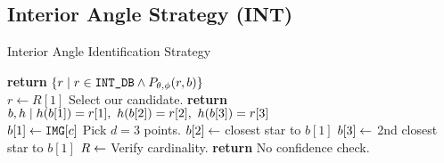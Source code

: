 \subsection{Interior Angle Strategy (INT)}\label{subsec:interiorAngleMethod}
\begin{algorithm}
    \caption{Interior Angle Identification Strategy} \label{algorithm:interiorAngleIdentification}
    \begin{algorithmic}[1]
    	\State \textbf{return} $\left\{  r \mid r \in \texttt{INT\_DB} \land P_{\theta, \phi}(r, b)  \right\}$
    	\EndFunction
        \\
        \State $r \gets R[1]$ \Comment Select our candidate.
        \State \textbf{return} $\imagesubset, \solutionmap \mid \solutionmap(\imagesubset[1]) = \candidateset[1], \ \solutionmap(\imagesubset[2]) = \candidateset[2], \ \solutionmap(\imagesubset[3]) = \candidateset[3]$
        \EndFunction
    	\\
        \State $b[1] \gets \texttt{IMG}[c]$ \Comment Pick $d=3$ points.
        \State $b[2] \gets $ closest star to $b[1]$
        \State $b[3] \gets $ 2nd closest star to $b[1]$
        \State $R \gets $ 
        \Comment Verify cardinality. 
        \State \textbf{return}  \Comment No confidence check.
        \EndIf
        \EndFor
        \EndProcedure
    \end{algorithmic}
\end{algorithm}

